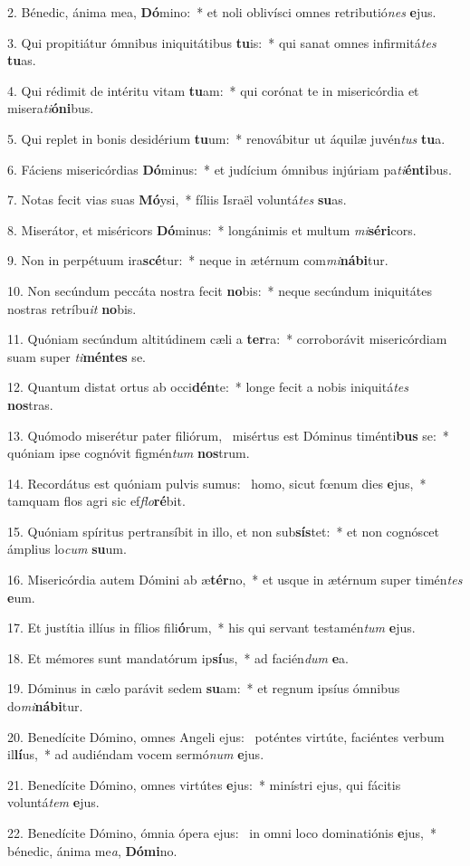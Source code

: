 2. Bénedic, ánima mea, \textbf{Dó}mino:~*  et noli oblivísci omnes retributió\textit{nes} \textbf{e}jus.\

3. Qui propitiátur ómnibus iniquitátibus \textbf{tu}is:~*  qui sanat omnes infirmitá\textit{tes} \textbf{tu}as.\

4. Qui rédimit de intéritu vitam \textbf{tu}am:~*  qui corónat te in misericórdia et misera\textit{ti}\textbf{ó}\textbf{ni}bus.\

5. Qui replet in bonis desidérium \textbf{tu}um:~*  renovábitur ut áquilæ juvén\textit{tus} \textbf{tu}a.\

6. Fáciens misericórdias \textbf{Dó}minus:~*  et judícium ómnibus injúriam pa\textit{ti}\textbf{én}\textbf{ti}bus.\

7. Notas fecit vias suas \textbf{Mó}ysi,~*  fíliis Israël voluntá\textit{tes} \textbf{su}as.\

8. Miserátor, et miséricors \textbf{Dó}minus:~*  longánimis et multum \textit{mi}\textbf{sé}\textbf{ri}cors.\

9. Non in perpétuum ira\textbf{scé}tur:~*  neque in ætérnum com\textit{mi}\textbf{ná}\textbf{bi}tur.\

10. Non secúndum peccáta nostra fecit \textbf{no}bis:~*  neque secúndum iniquitátes nostras retríbu\textit{it} \textbf{no}bis.\

11. Quóniam secúndum altitúdinem cæli a \textbf{ter}ra:~*  corroborávit misericórdiam suam super \textit{ti}\textbf{mén}\textbf{tes} se.\

12. Quantum distat ortus ab occi\textbf{dén}te:~*  longe fecit a nobis iniquitá\textit{tes} \textbf{nos}tras.\

13. Quómodo miserétur pater filiórum, \dag\  misértus est Dóminus timénti\textbf{bus} se:~*  quóniam ipse cognóvit figmén\textit{tum} \textbf{nos}trum.\

14. Recordátus est quóniam pulvis sumus: \dag\  homo, sicut fœnum dies \textbf{e}jus,~*  tamquam flos agri sic ef\textit{flo}\textbf{ré}bit.\

15. Quóniam spíritus pertransíbit in illo, et non sub\textbf{sís}tet:~*  et non cognóscet ámplius lo\textit{cum} \textbf{su}um.\

16. Misericórdia autem Dómini ab æ\textbf{tér}no,~*  et usque in ætérnum super timén\textit{tes} \textbf{e}um.\

17. Et justítia illíus in fílios fili\textbf{ó}rum,~*  his qui servant testamén\textit{tum} \textbf{e}jus.\

18. Et mémores sunt mandatórum ip\textbf{sí}us,~*  ad facién\textit{dum} \textbf{e}a.\

19. Dóminus in cælo parávit sedem \textbf{su}am:~*  et regnum ipsíus ómnibus do\textit{mi}\textbf{ná}\textbf{bi}tur.\

20. Benedícite Dómino, omnes Angeli ejus: \dag\  poténtes virtúte, faciéntes verbum il\textbf{lí}us,~*  ad audiéndam vocem sermó\textit{num} \textbf{e}jus.\

21. Benedícite Dómino, omnes virtútes \textbf{e}jus:~*  minístri ejus, qui fácitis voluntá\textit{tem} \textbf{e}jus.\

22. Benedícite Dómino, ómnia ópera ejus: \dag\  in omni loco dominatiónis \textbf{e}jus,~*  bénedic, ánima me\textit{a}, \textbf{Dó}\textbf{mi}no.\

